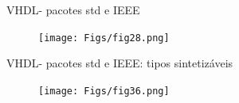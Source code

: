 \documentclass[aspectratio=169]{beamer}
\begin{document}
\begin{frame}{VHDL- pacotes std e IEEE}
	\justifying
	

	
	\begin{figure}[h]
		\centering
		\texttt{[image: Figs/fig28.png]}
	\end{figure}	
	
\end{frame}
\begin{frame}{VHDL- pacotes std e IEEE: tipos sintetizáveis}
	\justifying
	
	
	
	\begin{figure}[h]
		\centering
		\texttt{[image: Figs/fig36.png]}
	\end{figure}	
	
\end{frame}

\end{document}
